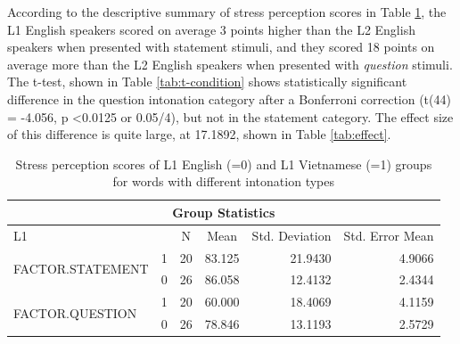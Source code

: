 \documentclass[a4paper]{article}
\begin{document}

According to the descriptive summary of stress perception scores in Table \ref{tab:stats-intonation-t}, the L1 English speakers scored on average 3 points higher than the L2 English speakers when presented with statement stimuli, and they scored 18 points on average more than the L2 English speakers when presented with \textit{question} stimuli. The t-test, shown in Table \ref{tab:t-condition} shows statistically significant difference in the question intonation category after a Bonferroni correction (t(44) = -4.056, p \textless 0.0125 or 0.05/4), but not in the statement category. The effect size of this difference is quite large, at 17.1892, shown in Table \ref{tab:effect}.

\begin{table}[H]
\centering
\caption{Stress perception scores of L1 English (=0) and L1 Vietnamese (=1) groups for words with different intonation types}
\label{tab:stats-intonation-t}
\begin{tabular}{|l|l|r|r|r|r|} 
\hline
\multicolumn{6}{|c|}{Group Statistics}                                                                                                                                   \\ 
\hline
L1                                &   & \multicolumn{1}{c|}{N} & \multicolumn{1}{c|}{Mean} & \multicolumn{1}{c|}{Std. Deviation} & \multicolumn{1}{c|}{Std. Error Mean}  \\ 
\hline
\multirow{2}{*}{FACTOR.STATEMENT} & 1 & 20                     & 83.125                    & 21.9430                             & 4.9066                                \\ 
\cline{2-6}
                                  & 0 & 26                     & 86.058                    & 12.4132                             & 2.4344                                \\ 
\hline
\multirow{2}{*}{FACTOR.QUESTION}  & 1 & 20                     & 60.000                    & 18.4069                             & 4.1159                                \\ 
\cline{2-6}
                                  & 0 & 26                     & 78.846                    & 13.1193                             & 2.5729                                \\
\hline
\end{tabular}
\end{table}
\end{document}
